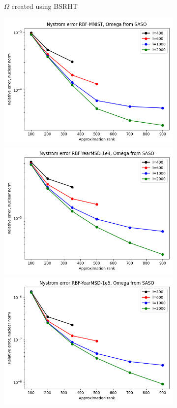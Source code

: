 \documentclass{article}
\theoremstyle{definition}
\begin{document}
\begin{figure}
\begin{subfigure}[t]{\textwidth+20pt\relax}
    \caption{$\Omega$ created using BSRHT}
\end{subfigure}\hfill
\begin{subfigure}[t]{0.4\textwidth}
    \includegraphics[width=\textwidth]{plots/relerror/relerror_RBF-MNIST_SASO.png}
    \includegraphics[width=\textwidth]{plots/relerror/relerror_RBF-YearMSD-1e4_SASO.png}
    \includegraphics[width=\textwidth]{plots/relerror/relerror_RBF-YearMSD-1e5_SASO.png}

\end{subfigure}
\end{figure}
\end{document}
